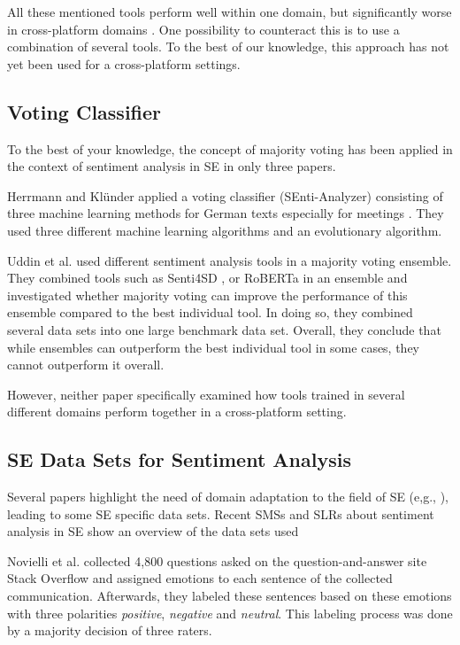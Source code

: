 All these mentioned tools perform well within one domain, but significantly worse in cross-platform domains \cite{noviellicross20,9240704}. One possibility to counteract this is to use a combination of several tools. To the best of our knowledge, this approach has not yet been used for a cross-platform settings.

\subsection{Voting Classifier}

To the best of your knowledge, the concept of majority voting has been applied in the context of sentiment analysis in SE in only three papers.

Herrmann and Klünder \cite{9582407} applied a voting classifier (SEnti-Analyzer) consisting of three machine learning methods for German texts especially for meetings \cite{9582407}. They used three different machine learning algorithms and an evolutionary algorithm.

Uddin et al. \cite{uddinVoting2021} used different sentiment analysis tools in a majority voting ensemble. They combined tools such as Senti4SD \cite{Calefato.2018}, or RoBERTa \cite{liu2019roberta} in an ensemble and investigated whether majority voting can improve the performance of this ensemble compared to the best individual tool. In doing so, they combined several data sets into one large benchmark data set. Overall, they conclude that while ensembles can outperform the best individual tool in some cases, they cannot outperform it overall. 

However, neither paper specifically examined how tools trained in several different domains perform together in a cross-platform setting.



\subsection{SE Data Sets for Sentiment Analysis}
\label{sec:dataset}

Several papers highlight the need of domain adaptation to the field of SE (e,g., \cite{Calefato.2018}), leading to some SE specific data sets. Recent SMSs and SLRs about sentiment analysis in SE show an overview of the data sets used \cite{obaidiSentiSMS22,linSentiSLR22}

Novielli et al. \cite{Novielli.2018b} collected 4,800 questions asked on the question-and-answer site Stack Overflow and assigned emotions to each sentence of the collected communication. Afterwards, they labeled these sentences based on these emotions with three polarities \textit{positive}, \textit{negative} and \textit{neutral}. This labeling process was done by a majority decision of three raters.

